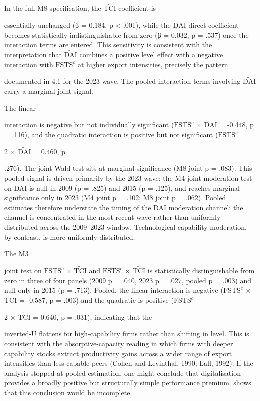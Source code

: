 \documentclass[12pt,a4paper]{article}
\begin{document}
In the full M8 specification, the \(\tilde{\mathrm{TCI}}\) coefficient
is

essentially unchanged (β = 0.184, p \textless{} .001), while the
\(\tilde{\mathrm{DAI}}\) direct coefficient becomes statistically
indistinguishable from zero (β = 0.032, p = .537) once the interaction
terms are entered. This sensitivity is consistent with the
interpretation that \(\tilde{\mathrm{DAI}}\) combines a positive level
effect with a negative interaction with \(\mathrm{FSTS}^{c}\) at higher
export intensities, precisely the pattern

documented in 4.1 for the 2023 wave. The pooled interaction terms
involving \(\tilde{\mathrm{DAI}}\) carry a marginal joint signal.

The linear

interaction is negative but not individually significant
(\(\mathrm{FSTS}^{c}\) × \(\tilde{\mathrm{DAI}}\) = -0.448, p = .116),
and the quadratic interaction is positive but not significant
(\(\mathrm{FSTS}^{c}\)

2 × \(\tilde{\mathrm{DAI}}\) = 0.460, p =

.276). The joint Wald test sits at marginal significance (M8 joint p =
.083). This pooled signal is driven primarily by the 2023 wave: the M4
joint moderation test on DAI is null in 2009 (p = .825) and 2015 (p =
.125), and reaches marginal significance only in 2023 (M4 joint p =
.102; M8 joint p = .062). Pooled estimates therefore understate the
timing of the DAI moderation channel: the channel is concentrated in the
most recent wave rather than uniformly distributed across the 2009--2023
window. Technological-capability moderation, by contrast, is more
uniformly distributed.

The M3

joint test on \(\mathrm{FSTS}^{c}\) × \(\tilde{\mathrm{TCI}}\) and
\(\mathrm{FSTS}^{c}\) × \(\tilde{\mathrm{TCI}}\) is statistically
distinguishable from zero in three of four panels (2009 p = .040, 2023 p
= .027, pooled p = .003) and null only in 2015 (p = .713). Pooled, the
linear interaction is negative (\(\mathrm{FSTS}^{c}\) ×
\(\tilde{\mathrm{TCI}}\) = -0.587, p = .003) and the quadratic is
positive (\(\mathrm{FSTS}^{c}\)

2 × \(\tilde{\mathrm{TCI}}\) = 0.640, p = .031), indicating that the

inverted-U flattens for high-capability firms rather than shifting in
level. This is consistent with the absorptive-capacity reading in which
firms with deeper capability stocks extract productivity gains across a
wider range of export intensities than less capable peers (Cohen and
Levinthal, 1990; Lall, 1992). If the analysis stopped at pooled
estimation, one might conclude that digitalisation provides a broadly
positive but structurally simple performance premium. shows that this
conclusion would be incomplete.
\end{document}

